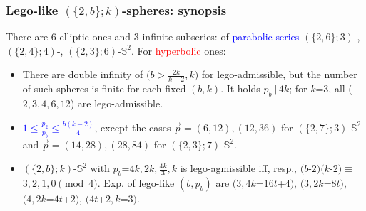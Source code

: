 \documentclass{beamer}
\begin{document}
\begin{frame}\frametitle{Lego-like   $(\{2,b\}; k)$-spheres: synopsis}
\vspace{-3mm}
There are $6$ elliptic ones  and $3$ infinite subseries: of \textcolor{blue}{parabolic series}  
   $(\{2,6\}; 3)$-,  $(\{2,4\}; 4)$-, $(\{2,3\}; 6)$-$\mathbb{S}^2$.
 For \textcolor{red}{hyperbolic} ones:
\begin{itemize}
\item There are double infinity of $(b$$>$$ \frac{2k}{k-2},k)$ for lego-admissible,
 but the number of such spheres is finite for each fixed $(b,k)$. 
 It holds $p_b\ |\, 4k$; for $k$=$3$, all ($2,3,4,6,12$) are lego-admissible.

\item \textcolor{blue}{$1\le \frac{p_2}{p_b}\le \frac{b(k-2)}{4}$}, except the  cases $\vec{p} = (6,12), (12,36)$ for
 $(\{2, 7\};3)$-$\mathbb{S}^2$ and $\vec{p} = (14,28), (28,84)$ for
 $(\{2, 3\};7)$-$\mathbb{S}^2$. 
\item  $(\{2,b\}; k)$-$\mathbb{S}^2$ with $p_b$=$4k,2k,\frac{4k}{3},k$ is lego-agmissible iff, resp., $(b$-$2)(k$-$2)$$\equiv$$3,2,1,0 \pmod 4$.
Exp. of lego-like $(b,p_b)$ are $(3,4k$=$16t$+$4)$, $(3,2k$=$8t)$, $(4,2k$=$4t$+$2)$, $(4t$+$2,k$=$3)$.

\end{itemize}
\begin{center}


\end{center}
\end{frame}
\end{document}

